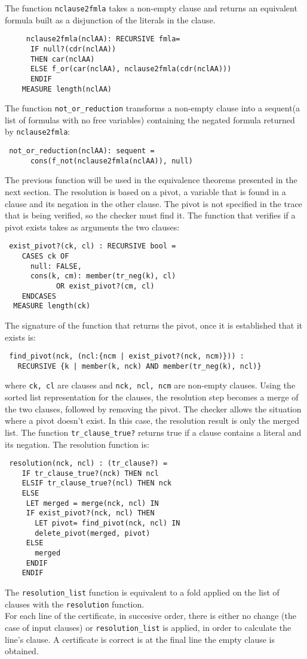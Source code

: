 \documentclass[a4paper,12pt]{article}
\begin{document}
The function \verb|nclause2fmla| takes a non-empty clause and returns an equivalent formula built as a disjunction
of the literals in the clause.  
\begin{verbatim}
     nclause2fmla(nclAA): RECURSIVE fmla= 
      IF null?(cdr(nclAA)) 
      THEN car(nclAA)
      ELSE f_or(car(nclAA), nclause2fmla(cdr(nclAA)))
      ENDIF
    MEASURE length(nclAA)
\end{verbatim}

The function \verb|not_or_reduction| transforms a non-empty clause into a sequent(a list of formulas with no 
free variables) containing the negated formula returned by \verb|nclause2fmla|:
\begin{verbatim}
 not_or_reduction(nclAA): sequent = 
      cons(f_not(nclause2fmla(nclAA)), null) 
\end{verbatim}
The previous function will be used in the equivalence theorems presented in the next section.
The resolution is based on a pivot, a variable that is found in a clause and its negation in the other clause. 
The pivot is not specified in the trace that is being verified, so the checker must find it. The function
that verifies if a pivot exists takes as arguments the two clauses:
\begin{verbatim}
 exist_pivot?(ck, cl) : RECURSIVE bool =
    CASES ck OF 
      null: FALSE,
      cons(k, cm): member(tr_neg(k), cl) 
		    OR exist_pivot?(cm, cl)
    ENDCASES
  MEASURE length(ck)
\end{verbatim}
The signature of the function that returns the pivot, once it is established that it exists is:
\begin{verbatim}
 find_pivot(nck, (ncl:{ncm | exist_pivot?(nck, ncm)})) : 
   RECURSIVE {k | member(k, nck) AND member(tr_neg(k), ncl)}
\end{verbatim}
where \verb|ck, cl| are clauses and \verb|nck, ncl, ncm| are non-empty clauses.
Using the sorted list representation for the clauses, the resolution step becomes a merge of the two clauses, 
followed by removing the pivot. The checker allows the situation where a pivot doesn't exist. In this case, the 
resolution result is only the merged list. The function \verb|tr_clause_true?| returns true if a clause contains
a literal and its negation. The resolution function is:
\begin{verbatim}
 resolution(nck, ncl) : (tr_clause?) = 
    IF tr_clause_true?(nck) THEN ncl
    ELSIF tr_clause_true?(ncl) THEN nck
    ELSE
     LET merged = merge(nck, ncl) IN
     IF exist_pivot?(nck, ncl) THEN
       LET pivot= find_pivot(nck, ncl) IN 
       delete_pivot(merged, pivot) 
     ELSE
       merged
     ENDIF
    ENDIF
\end{verbatim}
The \verb|resolution_list| function is equivalent to a fold applied on the list of clauses with the 
\verb|resolution| function.
\\For each line of the certificate, in succesive order, there is either no change 
(the case of input clauses) or \verb|resolution_list| is applied, in order to calculate the line's clause.
A certificate is correct is at the final line the empty clause is obtained.
\end{document}
